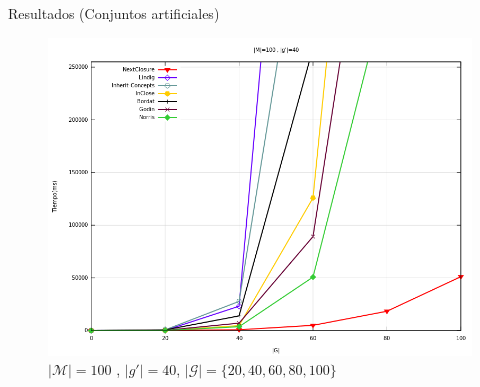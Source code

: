 \documentclass{beamer}
\newcommand{\M}{\mathcal{M}}
\newcommand{\G}{\mathcal{G}}
\begin{document}
\begin{frame}{Resultados (Conjuntos artificiales)}
      \begin{figure}[H]
      \centering
      \includegraphics[scale=0.3]{images/M100g40G20100.png}
      \caption{$|\M|=100$ , $|g'|=40$, $|\G|=\{20,40,60,80,100\}$}
     \end{figure}
  \end{frame}

  
\end{document}
